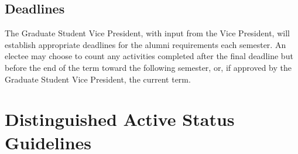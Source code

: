 \section{Deadlines}
The Graduate Student Vice President, with input from the Vice President, will establish appropriate deadlines for the alumni requirements each semester.
An electee may choose to count any activities completed after the final deadline but before the end of the term toward the following semester, or, if approved by the Graduate Student Vice President, the current term.





\chapter{Distinguished Active Status Guidelines}\label{sec:DAstatus}

